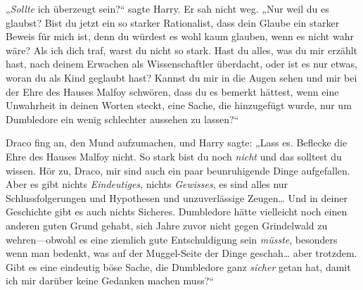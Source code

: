 „\emph{Sollte} ich überzeugt sein?“ sagte Harry. Er sah nicht weg. „Nur weil du es glaubst? Bist du jetzt ein so starker Rationalist, dass dein Glaube ein starker Beweis für mich ist, denn du würdest es wohl kaum glauben, wenn es nicht wahr wäre? Als ich dich traf, warst du nicht so stark. Hast du alles, was du mir erzählt hast, nach deinem Erwachen als Wissenschaftler überdacht, oder ist es nur etwas, woran du als Kind geglaubt hast? Kannst du mir in die Augen sehen und mir bei der Ehre des Hauses Malfoy schwören, dass du es bemerkt hättest, wenn eine Unwahrheit in deinen Worten steckt, eine Sache, die hinzugefügt wurde, nur um Dumbledore ein wenig schlechter aussehen zu lassen?“

Draco fing an, den Mund aufzumachen, und Harry sagte: „Lass es. Beflecke die Ehre des Hauses Malfoy nicht. So stark bist du noch \emph{nicht} und das solltest du wissen. Hör zu, Draco, mir sind auch ein paar beunruhigende Dinge aufgefallen. Aber es gibt nichts \emph{Eindeutiges}, nichts \emph{Gewisses}, es sind alles nur Schlussfolgerungen und Hypothesen und unzuverlässige Zeugen… Und in deiner Geschichte gibt es auch nichts Sicheres. Dumbledore hätte vielleicht noch einen anderen guten Grund gehabt, sich Jahre zuvor nicht gegen Grindelwald zu wehren—obwohl es eine ziemlich gute Entschuldigung sein \emph{müsste}, besonders wenn man bedenkt, was auf der Muggel-Seite der Dinge geschah… aber trotzdem. Gibt es eine eindeutig böse Sache, die Dumbledore ganz \emph{sicher} getan hat, damit ich mir darüber keine Gedanken machen muss?“

